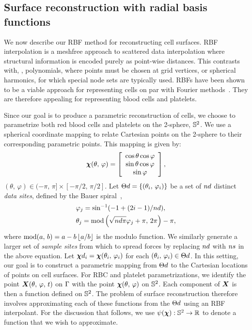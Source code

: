 \subsection{Surface reconstruction with radial basis functions}\label{sec:rbf-interpolation}

We now describe our RBF method for reconstructing cell surfaces. RBF interpolation is a
meshfree approach to scattered data interpolation where structural information is encoded
purely as point-wise distances. This contrasts with, , polynomials, where
points must be chosen at grid vertices, or spherical harmonics, for which special node
sets are typically used. RBFs have been shown to be a viable approach for representing
cells on par with Fourier methods~\cite{Shankar:2013ki}. They are therefore appealing for
representing blood cells and platelets.

Since our goal is to produce a parametric reconstruction of cells, we choose to
parametrize both red blood cells and platelets on the 2-sphere, $\mathbb{S}^2$. We use a
spherical coordinate mapping to relate Cartesian points on the 2-sphere to their
corresponding parametric points. This mapping is given by:
\begin{equation}
    \boldsymbol{\chi}(\theta,\,\varphi) =
    \left[\begin{array}{c}
        \cos\theta\cos\varphi \\
        \sin\theta\cos\varphi \\
        \sin\varphi
    \end{array}\right],
\end{equation}
$(\theta,\,\varphi)\in(-\pi,\,\pi]\times[-\pi/2,\,\pi/2]$. Let
$\data\sites = \{(\theta_i,\,\varphi_i)\}$ be a set of $\data\cardinality$ distinct
\emph{data sites}, defined by the Bauer spiral~\cite{Bauer:2000km},
\begin{equation}\label{eq:bauer-spiral}
    \begin{aligned}
        &\varphi_j = \sin^{-1}(-1 + (2i - 1) / \data\cardinality), \\
        &\theta_j = \modulo\left(\sqrt{\data\cardinality\pi}\varphi_j + \pi,\,2\pi\right) - \pi,
    \end{aligned}
\end{equation}
where $\operatorname{mod}(a,\,b) = a - b\left\lfloor{a/b}\right\rfloor$ is the modulo function. We similarly generate
a larger set of \emph{sample sites} from which to spread forces by replacing $\data\cardinality$
with $\sample\cardinality$ in the above equation. Let
$\data\Xp_i=\Xp(\theta_i,\,\varphi_i)$ for each $(\theta_i,\,\varphi_i)\in\data\sites$.
In this setting, our goal is to construct a parametric mapping from $\data\sites$ to the
Cartesian locations of points on cell surfaces. For RBC and platelet parametrizations, we
identify the point $\boldsymbol{X}(\theta,\,\varphi,\,t)$ on $\Gamma$ with the point
$\boldsymbol{\chi}(\theta,\,\varphi)$ on $\mathbb{S}^2$. Each component of $\boldsymbol{X}$ is then a function defined
on $\mathbb{S}^2$. The problem of surface reconstruction therefore involves approximating each
of these functions from the $\data\sites$ using an RBF interpolant. For the discussion
that follows, we use $\psi(\boldsymbol{\chi}):\mathbb{S}^2\to\mathbb{R}$ to denote a function that we wish to
approximate.

